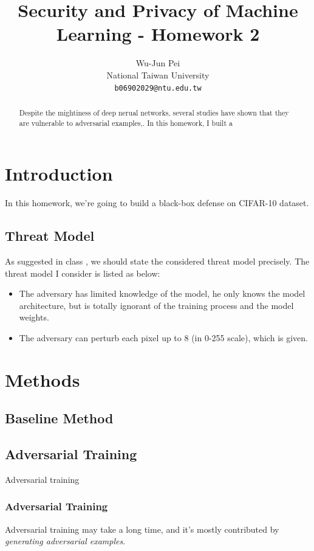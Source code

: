 \documentclass{article}
\title{Security and Privacy of Machine Learning - Homework 2}
\author{
  Wu-Jun Pei\\
  National Taiwan University\\
  \texttt{b06902029@ntu.edu.tw} \\
}
\begin{document}
\maketitle

\begin{abstract}
Despite the mightiness of deep nerual networks, several studies have shown that they are vulnerable
to adversarial examples,. In this homework, I built a
\end{abstract}

\section{Introduction}
In this homework, we're going to build a black-box defense on CIFAR-10 \cite{krizhevsky2009learning}
dataset.

\subsection{Threat Model}
As suggested in class \cite{spml0925}, we should state the considered threat model precisely. The
threat model I consider is listed as below:

\begin{itemize}
  \item The adversary has limited knowledge of the model, he only knows the model architecture, but
  is totally ignorant of the training process and the model weights.
  \item The adversary can perturb each pixel up to 8 (in 0-255 scale), which is given.
\end{itemize}

\section{Methods}
\subsection{Baseline Method}

\subsection{Adversarial Training}
Adversarial training \cite{madry2019deep}

\subsubsection{Adversarial Training}
Adversarial training may take a long time, and it's mostly contributed by \textit{generating
adversarial examples}.
\end{document}
